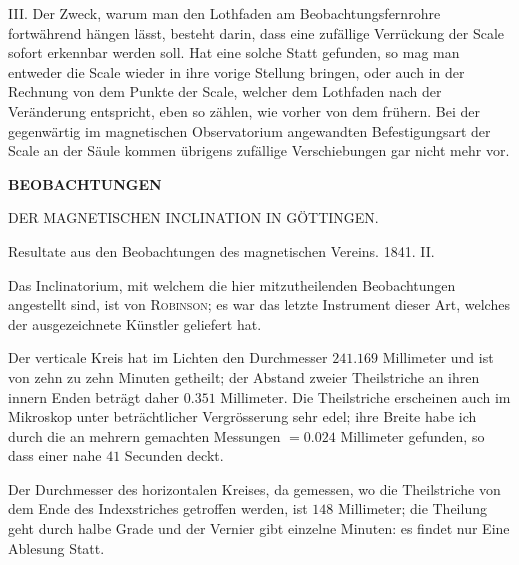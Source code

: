 III. Der Zweck, warum man den Lothfaden am Beobachtungsfernrohre fortwährend hängen lässt, besteht darin, dass eine zufällige Verrückung der Scale sofort erkennbar werden soll. Hat eine solche Statt gefunden, so mag man entweder die Scale wieder in ihre vorige Stellung bringen, oder auch in der Rechnung von dem Punkte der Scale, welcher dem Lothfaden nach der Veränderung entspricht, eben so zählen, wie vorher von dem frühern. Bei der gegenwärtig im magnetischen Observatorium angewandten Befestigungsart der Scale an der Säule kommen übrigens zufällige Verschiebungen gar nicht mehr vor.

\clearpage
{}
\begin{center}
{\Large\bfseries BEOBACHTUNGEN\par\medskip DER MAGNETISCHEN INCLINATION IN GÖTTINGEN.}
\par\bigskip
Resultate aus den Beobachtungen des magnetischen Vereins. 1841. II.
\end{center}
Das Inclinatorium, mit welchem die hier mitzutheilenden Beobachtungen angestellt sind, ist von \textsc{Robinson}; es war das letzte Instrument dieser Art, welches der ausgezeichnete Künstler geliefert hat.

Der verticale Kreis hat im Lichten den Durchmesser $241.169$ Millimeter und ist von zehn zu zehn Minuten getheilt; der Abstand zweier Theilstriche an ihren innern Enden beträgt daher $0.351$ Millimeter. Die Theilstriche erscheinen auch im Mikroskop unter beträchtlicher Vergrösserung sehr edel; ihre Breite habe ich durch die an mehrern gemachten Messungen $=0.024$ Millimeter gefunden, so dass einer nahe $41$ Secunden deckt.

Der Durchmesser des horizontalen Kreises, da gemessen, wo die Theilstriche von dem Ende des Indexstriches getroffen werden, ist $148$ Millimeter; die Theilung geht durch halbe Grade und der Vernier gibt einzelne Minuten: es findet nur Eine Ablesung Statt.

